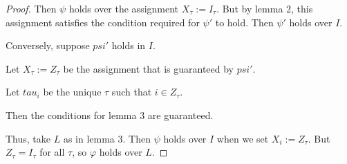 \documentclass{article}
\begin{document}
\begin{proof}
  Then $\psi$ holds over the assignment $X_\tau := I_\tau$. But by lemma 2, this assignment
  satisfies the condition required for $\psi'$ to hold. Then $\psi'$ holds over $I$.

  Conversely, suppose $psi'$ holds in $I$.

  Let $X_\tau := Z_\tau$ be the assignment that is guaranteed by $psi'$.

  Let $tau_i$ be the unique $\tau$ such that $i \in Z_\tau$.

  Then the conditions for lemma 3 are guaranteed.

  Thus, take $L$ as in lemma 3. Then $\psi$ holds over $I$ when we set $X_i := Z_\tau$.
  But $Z_\tau = I_\tau$ for all $\tau$, so $\varphi$ holds over $L$.
\end{proof}
\end{document}
